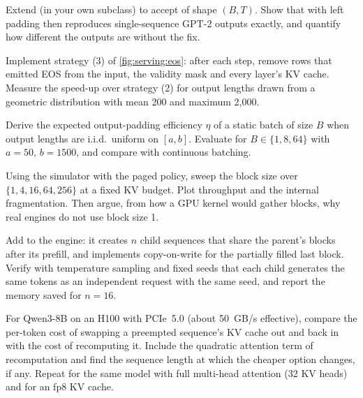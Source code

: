 \begin{exercise}\label{ex:serving:positions}
Extend  (in your own subclass) to accept  of shape $(B,T)$.
Show that  with left padding then reproduces single-sequence GPT-2 outputs exactly,
and quantify how different the outputs are without the fix.
\end{exercise}

\begin{exercise}
Implement strategy (3) of \cref{fig:serving:eos}: after each step, remove rows that emitted EOS from the
input, the validity mask and every layer's KV cache. Measure the speed-up over strategy (2) for output
lengths drawn from a geometric distribution with mean 200 and maximum 2,000.
\end{exercise}

\begin{exercise}
Derive the expected output-padding efficiency $\eta$ of a static batch of size $B$ when output lengths are
i.i.d.\ uniform on $[a,b]$. Evaluate for $B\in\{1,8,64\}$ with $a=50$, $b=1500$, and compare with
continuous batching.
\end{exercise}

\begin{exercise}
Using the simulator with the paged policy, sweep the block size over $\{1,4,16,64,256\}$ at a fixed KV
budget. Plot throughput and the internal fragmentation. Then argue, from how a GPU kernel would gather
blocks, why real engines do not use block size 1.
\end{exercise}

\begin{exercise}
Add  to the engine: it creates $n$ child sequences that share the parent's blocks
after its prefill, and implements copy-on-write for the partially filled last block. Verify with
temperature sampling and fixed seeds that each child generates the same tokens as an independent request
with the same seed, and report the memory saved for $n=16$.
\end{exercise}

\begin{exercise}
For Qwen3-8B on an H100 with PCIe~5.0 (about \SI{50}{GB/s} effective), compare the per-token cost of
swapping a preempted sequence's KV cache out and back in with the cost of recomputing it. Include the
quadratic attention term of recomputation and find the sequence length at which the cheaper option
changes, if any. Repeat for the same model with full multi-head attention (32 KV heads) and for an fp8
KV cache.
\end{exercise}

